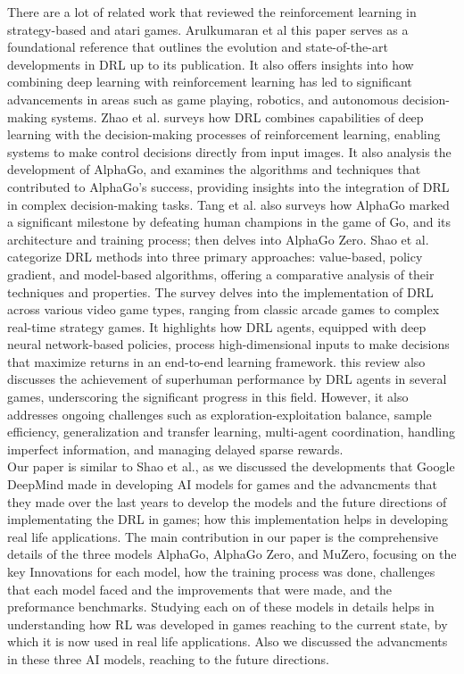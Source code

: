 There are a lot of related work that reviewed the
reinforcement learning in strategy-based and atari games. Arulkumaran et
al\cite{I9} this paper serves as a foundational reference that outlines 
the evolution and state-of-the-art developments in DRL up to its 
publication. It also offers insights into how combining deep learning 
with reinforcement learning has led to significant advancements in 
areas such as game playing, robotics, and autonomous decision-making 
systems. Zhao et al.\cite{I10} surveys how DRL combines 
capabilities of deep learning with the decision-making processes of 
reinforcement learning, enabling systems to make control decisions 
directly from input images. It also analysis the development of 
AlphaGo, and examines the algorithms and techniques that contributed 
to AlphaGo's success, providing insights into the integration of DRL 
in complex decision-making tasks. Tang et
al.\cite{I11} also surveys how AlphaGo marked a significant 
milestone by defeating human champions in the game of Go, and its 
architecture and training process; then delves into AlphaGo Zero. 
Shao et al.\cite{I12} categorize DRL methods into three primary 
approaches: value-based, policy gradient, and model-based algorithms, 
offering a comparative analysis of their techniques and properties.
The survey delves into the implementation of DRL across various video 
game types, ranging from classic arcade games to complex real-time 
strategy games.
It highlights how DRL agents, equipped with deep neural network-based 
policies, process high-dimensional inputs to make decisions that 
maximize returns in an end-to-end learning framework.
this review also discusses the achievement of superhuman performance 
by DRL agents in several games, underscoring the significant progress 
in this field.
However, it also addresses ongoing challenges such as exploration-exploitation 
balance, sample efficiency, generalization and transfer learning, 
multi-agent coordination, handling imperfect information, and managing 
delayed sparse rewards.\\
Our paper is similar to Shao et al.\cite{I12}, as we discussed the 
developments that Google DeepMind made in developing AI models for 
games and the advancments that they made over the last years to develop 
the models and the future directions of implementating the DRL in games; 
how this implementation helps in developing real life applications. The
main contribution in our paper is the comprehensive details of the three 
models AlphaGo, AlphaGo Zero, and MuZero, focusing on the key Innovations for 
each model, how the training process was done, challenges that each model
faced and the improvements that were made, and the preformance benchmarks. 
Studying each on of these models in details helps in understanding how 
RL was developed in games reaching to the current state, by which it is 
now used in real life applications.
Also we discussed the advancments in these three AI models, 
reaching to the future directions.